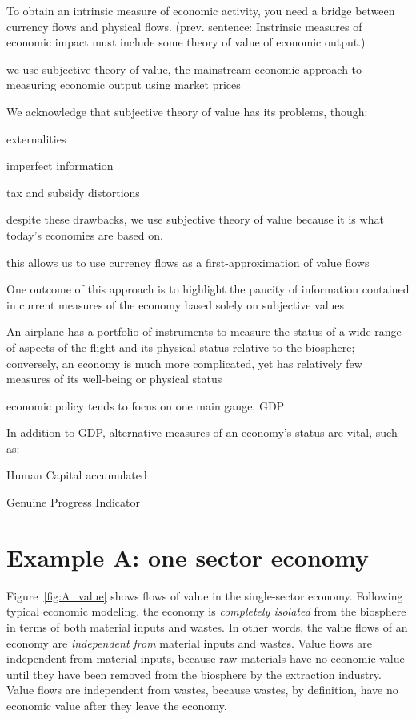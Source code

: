 \begin{outline}[enumerate]
\1 To obtain an intrinsic measure of economic activity, you need a bridge between currency flows and physical flows.  (prev. sentence: Instrinsic measures of economic impact must include some theory of value of economic output.)

	\2 we use subjective theory of value, the mainstream economic approach to measuring economic output using market prices

	\2 We acknowledge that subjective theory of value has its problems, though:

		\3 externalities

		\3 imperfect information

		\3 tax and subsidy distortions

	\2 despite these drawbacks, we use subjective theory of value because it is what today's economies are based on.

	\2 this allows us to use currency flows as a first-approximation of value flows

\1 One outcome of this approach is to highlight the paucity of information contained in current measures of the economy based solely on subjective values

	\2 An airplane has a portfolio of instruments to measure the status of a wide range of aspects of the flight and its physical status relative to the biosphere; conversely, an economy is much more complicated, yet has relatively few measures of its well-being or physical status

	\2 economic policy tends to focus on one main gauge, GDP

	\2 In addition to GDP, alternative measures of an economy's status are vital, such as:

		\3 Human Capital accumulated

		\3 Genuine Progress Indicator

\end{outline}


\section{Example A: one sector economy}

Figure~\ref{fig:A_value} shows flows of value in the single-sector economy.
Following typical economic modeling, 
the economy is \emph{completely isolated} from the biosphere
in terms of both material inputs and wastes.
In other words, the value flows of an economy are \emph{independent from}
material inputs and wastes.
Value flows are independent from material inputs,
because raw materials have no economic value 
until they have been removed from the biosphere by the extraction industry.
Value flows are independent from wastes,
because wastes, by definition, have no economic value 
after they leave the economy.

